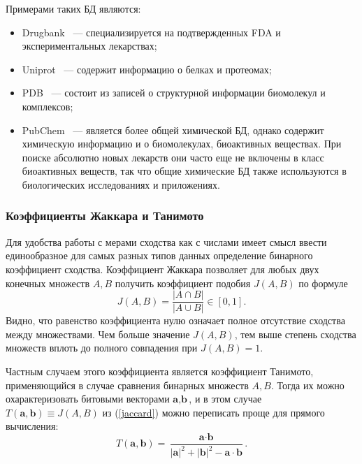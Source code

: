 \documentclass[a4paper,14pt]{article}         %
\begin{document}
Примерами таких БД являются: 
\begin{itemize}
	\item Drugbank \cite{drugbank}~--- специализируется на подтвержденных FDA и экспериментальных лекарствах; 
	\item Uniprot \cite{uniprot}~--- содержит информацию о белках и протеомах; 
	\item PDB \cite{pdb}~--- состоит из записей о структурной информации биомолекул и комплексов;  
	\item PubChem \cite{pubchem}~--- является более общей химической БД, однако содержит химическую информацию и о биомолекулах, биоактивных веществах. При поиске абсолютно новых лекарств они часто еще не включены в класс биоактивных веществ, так что общие химические БД также используются в биологических исследованиях и приложениях.
\end{itemize}
\subsubsection{Коэффициенты Жаккара и Танимото} \label{sec:tanim}
Для удобства работы с мерами сходства как с числами имеет смысл ввести единообразное для самых разных типов данных определение бинарного коэффициент сходства. Коэффициент Жаккара \cite{Jaccard1901} позволяет для любых двух конечных множеств $A, B$ получить коэффициент подобия $J(A, B)$ по формуле
\begin{equation}
\label{jaccard}
J(A, B) = \frac{|A\cap B|}{|A\cup B|} \in [0, 1].
\end{equation}
Видно, что равенство коэффициента нулю означает полное отсутствие сходства между множествами. Чем больше значение $J(A, B)$, тем выше степень сходства множеств вплоть до полного совпадения при $J(A, B) = 1$.

Частным случаем этого коэффициента является коэффициент Танимото, применяющийся в случае сравнения бинарных множеств $A, B$. Тогда их можно охарактеризовать битовыми векторами $\textbf{a}, \textbf{b}$, и в этом случае \linebreak $T(\textbf{a}, \textbf{b}) \equiv J(A, B) $ из (\ref{jaccard}) можно переписать проще для прямого вычисления:
\begin{equation}
T(\textbf{a}, \textbf{b}) = \frac{\textbf{a}\cdot\textbf{b}}{|\textbf{a}|^2 + |\textbf{b}|^2 - \textbf{a}\cdot\textbf{b}}.
\end{equation}
\end{document}
